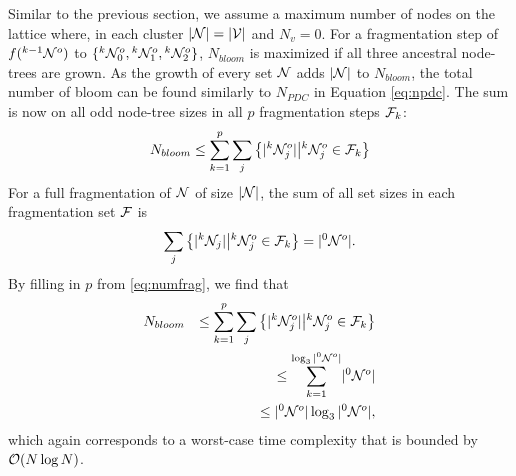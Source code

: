 Similar to the previous section, we assume a maximum number of nodes on the lattice where, in each cluster $|\mathcal{N}| = |\mathcal{V}|$ and $N_v = 0$. For a fragmentation step of $f({}^{k-1}\mathcal{N}^o)$ to $\{{}^{k}\mathcal{N}^o_0, {}^{k}\mathcal{N}^o_1, {}^{k}\mathcal{N}^o_2\}$, $N_{bloom}$ is maximized if all three ancestral node-trees are grown. As the growth of every set $\mathcal{N}$ adds $|\mathcal{N}|$ to $N_{bloom}$, the total number of bloom can be found similarly to $N_{PDC}$ in Equation \eqref{eq:npdc}. The sum is now on all odd node-tree sizes in all $p$ fragmentation steps $\mathcal{F}_k$:
\begin{equation}\label{eq:nnode}
  N_{bloom} \leq \sum^{p}_{k=1}\sum_j \left\{ \abs{\pre{k}\nset^o_j} \big| \pre{k}\nset^o_j \in \m{F}_k \right\}
\end{equation}
For a full fragmentation of $\mathcal{N}$ of size $|\mathcal{N}|$, the sum of all set sizes in each fragmentation set $\mathcal{F}$ is
\begin{equation}\label{eq:sumsetsfrag}
  \sum_j \left\{ \abs{\pre{k}\nset_j} \big| \pre{k}\nset^o_j \in \m{F}_k \right\} = \abs{\pre{0}\nset^o}.
\end{equation}
By filling in $p$ from \eqref{eq:numfrag}, we find that
\begin{align}
  \nonumber & N_{bloom} & \leq \sum^{p}_{k=1}\sum_j \left\{ \lvert{}^{k}\mathcal{N}^o_j\rvert \big| {}^{k}\mathcal{N}^o_j \in \mathcal{F}_k \right\} & \\
  \nonumber &           & \leq \sum_{k=1}^{\log_3{\lvert{}^{0}\mathcal{N}^o\rvert}} \lvert{}^{0}\mathcal{N}^o\rvert                                  & \\
            &           & \leq \lvert{}^{0}\mathcal{N}^o\rvert\log_3{\lvert{}^{0}\mathcal{N}^o\rvert},                                               &
\end{align}
which again corresponds to a worst-case time complexity that is bounded by $\mathcal{O}(N\log{N})$.
